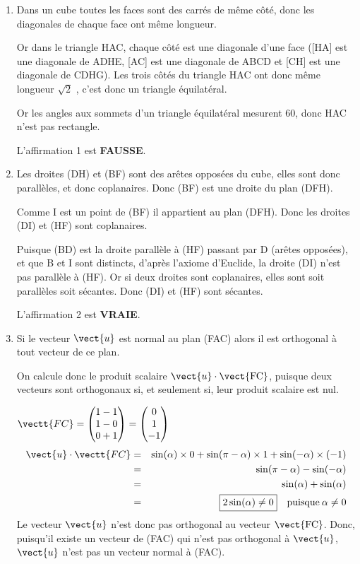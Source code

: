 \smallskip

\begin{enumerate}
	\item Dans un cube toutes les faces sont des carrés de même côté, donc les diagonales de chaque face ont même longueur.

Or dans le triangle HAC, chaque côté est une diagonale d'une face ([HA] est une diagonale de ADHE, [AC] est une diagonale de ABCD et [CH] est une diagonale de CDHG). Les trois côtés du triangle HAC ont donc même longueur $\sqrt2$
, c'est donc un triangle équilatéral.

Or les angles aux sommets d'un triangle équilatéral mesurent 60\Degre, donc HAC n'est pas rectangle.

\smallskip

L'affirmation 1 est \textbf{FAUSSE}.
	\item Les droites (DH) et (BF) sont des arêtes opposées du cube, elles sont donc parallèles, et donc coplanaires. Donc (BF) est une droite du plan (DFH).

Comme I est un point de (BF) il appartient au plan (DFH). Donc les droites (DI) et (HF) sont coplanaires.

Puisque (BD) est la droite parallèle à (HF) passant par D (arêtes opposées), et que B et I sont distincts, d'après l'axiome d'Euclide, la droite (DI) n'est pas parallèle à (HF). Or si deux droites sont coplanaires, elles sont soit parallèles soit sécantes. Donc (DI) et (HF) sont sécantes.

\smallskip
	
L'affirmation 2 est \textbf{VRAIE}.
	\item Si le vecteur $\vect{u}$ est normal au plan (FAC) alors il est orthogonal à tout vecteur de ce plan.

On calcule donc le produit scalaire $\vect{u} \cdot \vect{\text{FC}}$, puisque deux vecteurs sont orthogonaux si, et seulement si, leur produit scalaire est nul.
	
	$\vectt{FC} = \begin{pmatrix}1-1\\1-0\\0+1\end{pmatrix} = \begin{pmatrix}0\\1\\-1\end{pmatrix}$
\begin{eqnarray*}
\vect{u} \cdot \vectt{FC} &=& \sin(\alpha) \times 0 + \sin(\pi - \alpha) \times 1 + \sin(-\alpha) \times (-1)\\
		&=& \sin(\pi - \alpha) - \sin(-\alpha)\\
		&=& \sin(\alpha) + \sin(\alpha)\\
		&=& \boxed{2\sin(\alpha) \neq 0} \quad \text{puisque} \:\alpha \ne 0
	\end{eqnarray*}
	Le vecteur $\vect{u}$ n'est donc pas orthogonal au vecteur $\vect{\text{FC}}$. Donc, puisqu'il existe un vecteur de (FAC) qui n'est pas orthogonal à $\vect{u}$, $\vect{u}$ n'est pas un vecteur normal à (FAC).


\end{enumerate}
